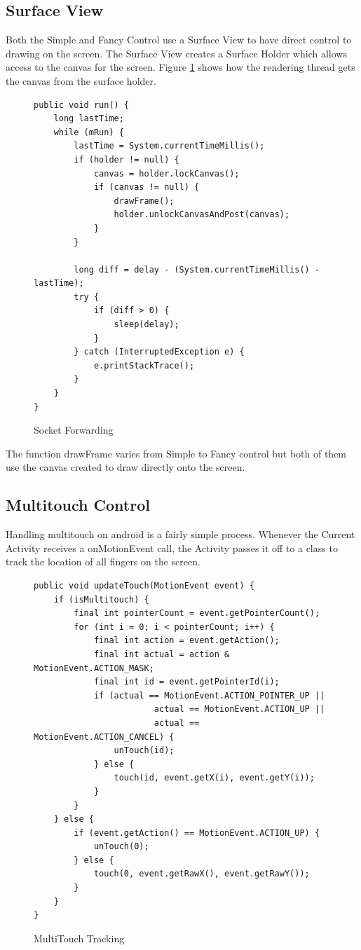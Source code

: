 \subsection{Surface View}

Both the Simple and Fancy Control use a Surface View to have direct control to drawing on the screen.  The Surface View creates a Surface Holder which allows access to the canvas for the screen.  Figure \ref{figure:canvas_renderer} shows how the rendering thread gets the canvas from the surface holder.

\begin{figure}[H]
\begin{lstlisting}
public void run() {
	long lastTime;
	while (mRun) {
		lastTime = System.currentTimeMillis();
		if (holder != null) {
			canvas = holder.lockCanvas();
			if (canvas != null) {
				drawFrame();
				holder.unlockCanvasAndPost(canvas);
			}
		}
		
		long diff = delay - (System.currentTimeMillis() - lastTime);
		try {
			if (diff > 0) {
				sleep(delay);
			}
		} catch (InterruptedException e) {
			e.printStackTrace();
		}
	}
}
\end{lstlisting}
\caption{Socket Forwarding}
\label{figure:canvas_renderer}
\end{figure}

The function drawFrame varies from Simple to Fancy control but both of them use the canvas created to draw directly onto the screen.

\subsection{Multitouch Control}

Handling multitouch on android is a fairly simple process.  Whenever the Current Activity receives a onMotionEvent call, the Activity passes it off to a class to track the location of all fingers on the screen.

\begin{figure}[H]
\begin{lstlisting}
public void updateTouch(MotionEvent event) {
	if (isMultitouch) {
	    final int pointerCount = event.getPointerCount();
	    for (int i = 0; i < pointerCount; i++) {
            final int action = event.getAction();
            final int actual = action & MotionEvent.ACTION_MASK;
            final int id = event.getPointerId(i);
            if (actual == MotionEvent.ACTION_POINTER_UP || 
                        actual == MotionEvent.ACTION_UP || 
                        actual == MotionEvent.ACTION_CANCEL) {
            	unTouch(id);
            } else {
            	touch(id, event.getX(i), event.getY(i));
            }
	    }
	} else {
		if (event.getAction() == MotionEvent.ACTION_UP) {
			unTouch(0);
		} else {
			touch(0, event.getRawX(), event.getRawY());
		}
	}
}
\end{lstlisting}
\caption{MultiTouch Tracking}
\label{figure:android_multitouch}
\end{figure}

